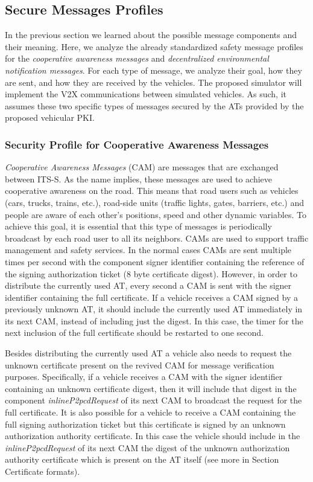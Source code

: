 \subsection{Secure Messages Profiles}
In the previous section we learned about the possible message components and their meaning. Here, we analyze the already standardized safety message profiles for the \textit{cooperative awareness messages} and \textit{decentralized environmental notification messages}. For each type of message, we analyze their goal, how they are sent, and how they are received by the vehicles. The proposed simulator will implement the V2X communications between simulated vehicles. As such, it assumes these two specific types of messages secured by the ATs provided by the proposed vehicular PKI.

\subsubsection{Security Profile for Cooperative Awareness Messages}
\textit{Cooperative Awareness Messages} (CAM) are messages that are exchanged between ITS-S. As the name implies, these messages are used to achieve cooperative awareness on the road. This means that road users such as vehicles (cars, trucks, trains, etc.), road-side units (traffic lights, gates, barriers, etc.) and people are aware of each other's positions, speed and other dynamic variables. To achieve this goal, it is essential that this type of messages is periodically broadcast by each road user to all its neighbors. CAMs are used to support traffic management and safety services. In the normal cases CAMs are sent multiple times per second with the component signer identifier containing the reference of the signing authorization ticket (8 byte certificate digest). However, in order to distribute the currently used AT, every second a CAM is sent with the signer identifier containing the full certificate. If a vehicle receives a CAM signed by a previously unknown AT, it should include the currently used AT immediately in its next CAM, instead of including just the digest. In this case, the timer for the next inclusion of the full certificate should be restarted to one second. 

Besides distributing the currently used AT a vehicle also needs to request the unknown certificate present on the revived CAM for message verification purposes. Specifically, if a vehicle receives a CAM with the signer identifier containing an unknown certificate digest, then it will include that digest in the component \textit{inlineP2pcdRequest} of its next CAM to broadcast the request for the full certificate. 
It is also possible for a vehicle to receive a CAM containing the full signing authorization ticket but this certificate is signed by an unknown authorization authority certificate. In this case the vehicle should include in the \textit{inlineP2pcdRequest} of its next CAM the digest of the unknown authorization authority certificate which is present on the AT itself (see more in Section Certificate formats).

